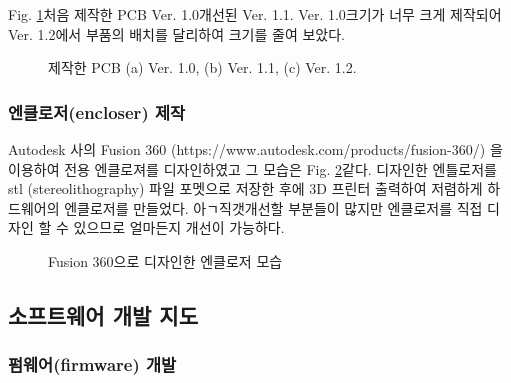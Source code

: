\clearpage

Fig. \ref{fig:pcbcircuit}\은 처음 제작한 PCB Ver. 1.0\과 개선된 Ver. 1.1. Ver. 1.0\은 크기가 너무 크게 제작되어 Ver. 1.2에서 부품의 배치를 달리하여 크기를 줄여 보았다.

\begin{figure}[h]
	\begin{center}
		\caption{제작한 PCB (a) Ver. 1.0, (b) Ver. 1.1, (c) Ver. 1.2.}
		\label{fig:pcbcircuit}
	\end{center}
\end{figure}

\subsubsection{엔클로저(encloser) 제작}

Autodesk 사의 Fusion 360 (https://www.autodesk.com/products/fusion-360/) 을 이용하여 전용 엔클로져를 디자인하였고 그 모습은 Fig. \ref{fig:stl}\와 같다. 디자인한 엔틀로저를 stl (stereolithography) 파일 포멧으로 저장한 후에 3D 프린터 출력하여 저렴하게 하드웨어의 엔클로저를 만들었다. 아ㄱ직갯개선할 부분들이 많지만 엔클로저를 직접 디자인 할 수 있으므로 얼마든지 개선이 가능하다. 

\begin{figure}[h]
	\begin{center}
			\caption{Fusion 360으로 디자인한 엔클로저 모습}
		\label{fig:stl}
	\end{center}
\end{figure}

\clearpage

\subsection{소프트웨어 개발 지도}

\subsubsection{펌웨어(firmware) 개발}

